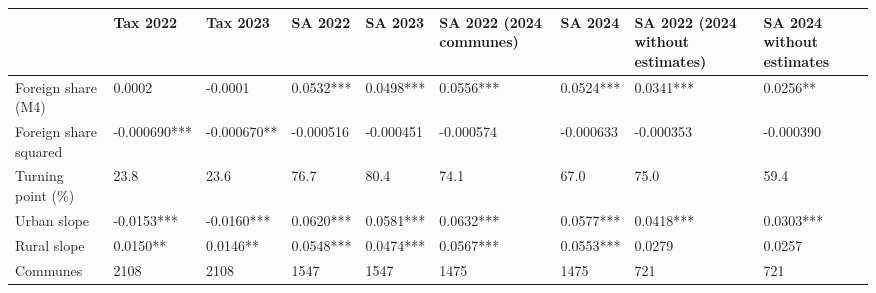 \begin{tabular}{lllllllll}
\toprule
 & Tax 2022 & Tax 2023 & SA 2022 & SA 2023 & SA 2022 (2024 communes) & SA 2024 & SA 2022 (2024 without estimates) & SA 2024 without estimates \\
\midrule
Foreign share (M4) & 0.0002 & -0.0001 & 0.0532*** & 0.0498*** & 0.0556*** & 0.0524*** & 0.0341*** & 0.0256** \\
Foreign share squared & -0.000690*** & -0.000670** & -0.000516 & -0.000451 & -0.000574 & -0.000633 & -0.000353 & -0.000390 \\
Turning point (\%) & 23.8 & 23.6 & 76.7 & 80.4 & 74.1 & 67.0 & 75.0 & 59.4 \\
Urban slope & -0.0153*** & -0.0160*** & 0.0620*** & 0.0581*** & 0.0632*** & 0.0577*** & 0.0418*** & 0.0303*** \\
Rural slope & 0.0150** & 0.0146** & 0.0548*** & 0.0474*** & 0.0567*** & 0.0553*** & 0.0279 & 0.0257 \\
Communes & 2108 & 2108 & 1547 & 1547 & 1475 & 1475 & 721 & 721 \\
\bottomrule
\end{tabular}
